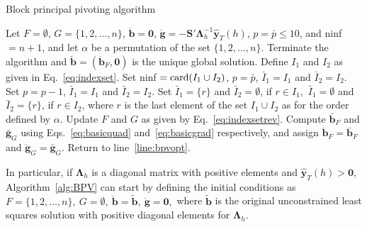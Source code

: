 \documentclass[11pt]{article}
\newcommand{\0}{\phantom{0}}
\begin{document}
\begin{algorithm}
	\caption{Block principal pivoting algorithm}
	\label{alg:BPV}
	\begin{spacing}{1.3}
		\begin{algorithmic}[1]
			\Require Let $F = \emptyset$, $G = \{1, 2, \dots, n\}$, $\ddot{\bm{b}} = \bm{0}$, $\ddot{\bm{g}} = -\bm{S}'\bm{\Lambda}_{h}^{-1}\hat{\bm{y}}_{T}(h)$, $p = \bar{p} \leq 10$, and ninf $= n + 1$, and let $\alpha$ be a permutation of the set $\{1, 2, \dots, n\}$.
			 \label{line:bpvopt}
			\State Terminate the algorithm and $\breve{\bm{b}} = (\ddot{\bm{b}}_{F}, \bm{0})$ is the unique global solution.
			\Else{}
			\State Define $I_{1}$ and $I_{2}$ as given in Eq.~\eqref{eq:indexset}.
			\State Set ninf $= \textnormal{card}(I_{1} \cup I_{2})$, $p = \bar{p}$, $\bar{I}_{1} = I_{1}$ and $\bar{I}_{2} = I_{2}$.
			\State Set $p = p - 1$, $\bar{I}_{1} = I_{1}$ and $\bar{I}_{2} = I_{2}$.
			\State Set $\bar{I}_{1} = \{r\}$ and $\bar{I}_{2} = \emptyset$, if $r \in I_{1},$
			\State \hspace{5.3mm} $\bar{I}_{1} = \emptyset $ and $\bar{I}_{2} = \{r\}$, if $r \in I_{2}$,
			\State where $r$ is the last element of the set $I_{1} \cup I_{2}$ as for the order defined by $\alpha$.
			\EndIf
			\State Update $F$ and $G$ as given by Eq.~\eqref{eq:indexsetrev}.
			\State Compute $\bar{\bm{b}}_{F}$ and $\bar{\bm{g}}_{G}$ using Eqs.~\eqref{eq:basicquad} and~\eqref{eq:basicgrad} respectively, and assign $\ddot{\bm{b}}_{F} = \bar{\bm{b}}_{F}$ and $\ddot{\bm{g}}_{G} = \bar{\bm{g}}_{G}$.
			\State Return to line~\ref{line:bpvopt}.
			\EndIf
		\end{algorithmic}
	\end{spacing}
\end{algorithm}


In particular, if $\bm{\Lambda}_{h}$ is a diagonal matrix with positive elements and $\hat{\bm{y}}_{T}(h) > \bm{0}$, Algorithm~\ref{alg:BPV} can start by defining the initial conditions as $
F = \{1, 2, \dots, n\},\ G = \emptyset,\ \ddot{\bm{b}} = \tilde{\bm{b}},\ \ddot{\bm{g}} = \bm{0},$
where $\tilde{\bm{b}}$ is the original unconstrained least squares solution with positive diagonal elements for $\bm{\Lambda}_{h}$.
\end{document}
